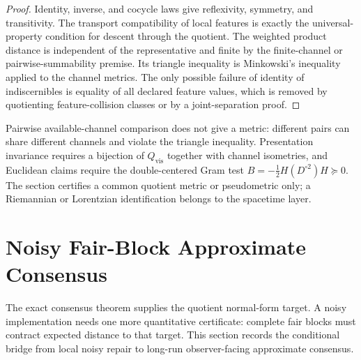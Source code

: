 \documentclass[11pt]{article}
\theoremstyle{remark}
\theoremstyle{plain}
\begin{document}
\begin{proof}
Identity, inverse, and cocycle laws give reflexivity, symmetry, and transitivity. The transport
compatibility of local features is exactly the universal-property condition for descent through
the quotient. The weighted product distance is independent of the
representative and finite by the finite-channel or pairwise-summability
premise. Its triangle inequality is Minkowski's inequality applied to the
channel metrics. The only possible
failure of identity of indiscernibles is equality of all declared feature values, which is
removed by quotienting feature-collision classes or by a joint-separation proof.
\end{proof}

Pairwise available-channel comparison does not give a metric: different
pairs can share different channels and violate the triangle inequality.
Presentation invariance requires a bijection of \(Q_{\mathrm{vis}}\)
together with channel isometries, and Euclidean claims require the
double-centered Gram test \(B=-\frac12H(D^{\circ2})H\succeq0\). The section
certifies a common quotient metric or pseudometric only; a Riemannian or
Lorentzian identification belongs to the spacetime layer.

\section{Noisy Fair-Block Approximate Consensus}
\label{sec:noisy-fair-block-consensus}

The exact consensus theorem supplies the quotient normal-form target. A noisy implementation
needs one more quantitative certificate: complete fair blocks must contract expected distance to
that target. This section records the conditional bridge from local noisy repair to long-run
observer-facing approximate consensus.
\end{document}
